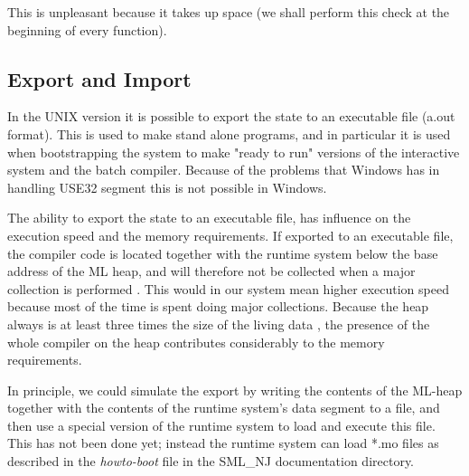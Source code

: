 This is unpleasant because it takes up space (we shall perform this
check at the beginning of every function).

\subsection{Export and Import}

In the UNIX version it is possible to export the state to an
executable file (a.out format). This is used to make stand alone
programs, and in particular it is used when bootstrapping the system
to make "ready to run" versions of the interactive system and the
batch compiler. Because of the problems that Windows has in handling
USE32 segment this is not possible in Windows.

The ability to export the state to an executable file, has influence
on the execution speed and the memory requirements. If exported to an
executable file, the compiler code is located together with the runtime
system below the base address of the ML heap, and will therefore not be
collected when a major collection is performed \cite{bib:gc}. This
would in our system mean higher execution speed because most of the
time is spent doing major collections. Because the heap always is at
least three times the size of the living data
\cite{bib:gc,bib:runtimesystem}, the presence of the whole compiler on
the heap contributes considerably to the memory requirements.

In principle, we could simulate the export by writing the contents of
the ML-heap together with the contents of the runtime system's data
segment to a file, and then use a special version of the runtime
system to load and execute this file. This has not been done yet;
instead the runtime system can load *.mo files as described in the
{\em howto-boot\/} file in the SML\_NJ documentation directory.



